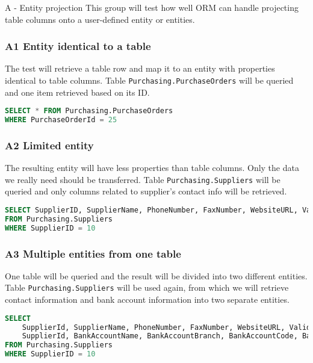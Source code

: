 \subsubsection{}{A - Entity projection}
This group will test how well ORM can handle projecting table columns onto a user-defined entity or entities.

\subsubsection*{A1 Entity identical to a table} \label{query:a1}
The test will retrieve a table row and map it to an entity with properties identical to table columns. 
Table \texttt{Purchasing.PurchaseOrders} will be queried and one item retrieved based on its ID.

\begin{lstlisting}[language=SQL]
SELECT * FROM Purchasing.PurchaseOrders 
WHERE PurchaseOrderId = 25
\end{lstlisting}

\subsubsection*{A2 Limited entity} \label{query:a2}
The resulting entity will have less properties than table columns. Only the data we really need should be transferred. 
Table \texttt{Purchasing.Suppliers} will be queried and only columns related to supplier's contact info will be retrieved.

\begin{lstlisting}[language=SQL]
SELECT SupplierID, SupplierName, PhoneNumber, FaxNumber, WebsiteURL, ValidFrom, ValidTo 
FROM Purchasing.Suppliers 
WHERE SupplierID = 10
\end{lstlisting}

\subsubsection*{A3 Multiple entities from one table} \label{query:a3}
One table will be queried and the result will be divided into two different entities. 
Table \texttt{Purchasing.Suppliers} will be used again, from which we will retrieve contact information and bank account information into two separate entities. 

\begin{lstlisting}[language=SQL]
SELECT 
    SupplierId, SupplierName, PhoneNumber, FaxNumber, WebsiteURL, ValidFrom, ValidTo, 
    SupplierId, BankAccountName, BankAccountBranch, BankAccountCode, BankAccountNumber, BankInternationalCode 
FROM Purchasing.Suppliers 
WHERE SupplierID = 10
\end{lstlisting}

